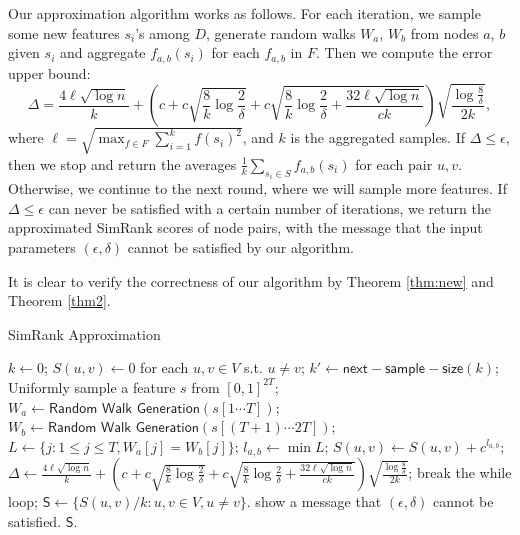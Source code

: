 \documentclass{article}
\begin{document}
Our approximation algorithm works as follows. For each iteration, we sample some new features $s_i$'s among $D$, generate random walks $W_a$, $W_b$ from nodes $a$, $b$ given $s_i$ and aggregate $f_{a,b}(s_i)$ for each $f_{a,b}$ in $F$. Then we compute the error upper bound:
$$\Delta = \frac{4\ell\sqrt{\log n}}{k} +\left(c+c\sqrt{\frac{8}{k}\log \frac{2}{\delta}} + c\sqrt{\frac{8}{k}\log \frac{2}{\delta} + \frac{32\ell\sqrt{\log n}}{ck}}\right)\sqrt{\frac{\log \frac{8}{\delta}}{2k}},$$
where $\ell = \sqrt{\max_{f\in F} \sum_{i=1}^k f(s_i)^2}$, and $k$ is the aggregated samples. 
If $\Delta \leq \epsilon$, then we stop and return the averages $\frac{1}{k}\sum_{s_i\in S}f_{a,b}(s_i)$ for each pair $u, v$. Otherwise, we continue to the next round, where we will sample more features. If $\Delta \leq \epsilon$ can never be satisfied with a certain number of iterations, we return the approximated SimRank scores of node pairs, with the message that the input parameters $(\epsilon,\delta)$ cannot be satisfied by our algorithm.

It is clear to verify the correctness of our algorithm by Theorem \ref{thm:new} and Theorem \ref{thm2}.

\begin{algorithm}[!t]
\caption{\textsf{SimRank Approximation}}
\label{alg:sra}
\renewcommand{\algorithmicrequire}{\textbf{Input:}}
\renewcommand{\algorithmicensure}{\textbf{Output:}}
\begin{algorithmic}
\State $k \gets 0$;
\State $S(u,v) \gets 0$ for each $u, v \in V$ s.t. $u\not= v$;
	\State $k' \gets \mathsf{next-sample-size}(k)$;
		\State Uniformly sample a feature $s$ from $[0,1]^{2T}$;
			\State $W_a \gets \textsf{Random Walk Generation}(s[1\cdots T])$;
			\State $W_b \gets \textsf{Random Walk Generation}(s[(T+1)\cdots 2T])$;
			\State $L \gets \{j: 1\leq j\leq T, W_a[j] = W_b[j]\}$;
				\State $l_{a,b} \gets \min L$;
				\State $S(u,v) \gets S(u,v)+c^{l_{a,b}}$;
			\EndIf
		\EndFor
	\EndFor
	\State $\Delta \gets \frac{4\ell\sqrt{\log n}}{k} +\left(c+c\sqrt{\frac{8}{k}\log \frac{2}{\delta}} + c\sqrt{\frac{8}{k}\log \frac{2}{\delta} + \frac{32\ell\sqrt{\log n}}{ck}}\right)\sqrt{\frac{\log \frac{8}{\delta}}{2k}}$;
	\If {$\Delta \leq \epsilon$}
		\State break the while loop;
	\EndIf
\EndFor
\State $\mathsf{S} \gets \{S(u,v)/k : u,v\in V, u\not=v\}$.
	\State show a message that $(\epsilon,\delta)$ cannot be satisfied.
\EndIf
{} $\mathsf{S}$.
\end{algorithmic}
\end{algorithm}
\end{document}
